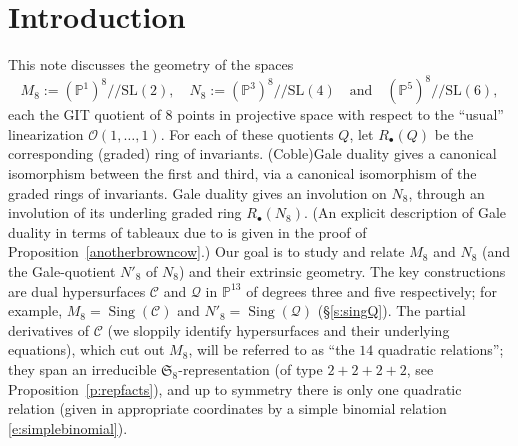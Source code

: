 \documentclass{amsart}
\theoremstyle{definition}
\theoremstyle{remark}
\DeclareMathOperator{\Sing}{Sing}
\def\SL{\mathrm{SL}}
\def\SS{\mathfrak{S}}
\def\proj{\mathbb{P}}
\def\cq{/\!/}
\def\cubic{\mathcal{C}}
\def\quintic{\mathcal{Q}}
\let\mc\mathcal
\begin{document}
\tableofcontents


\section{Introduction}

This note discusses the  geometry of the spaces
\begin{displaymath}
M_8 := (\proj^1)^8 \!\cq \SL(2), \quad  N_8 := (\proj^3)^8 \!\cq \SL(4) \quad \text{and}
\quad (\proj^5)^8 \!\cq \SL(6),
\end{displaymath}
each the GIT quotient of $8$ points in projective space with respect to the ``usual'' linearization
$\mc{O}(1,\dots,1)$.  For each of these quotients $Q$, let $R_{\bullet}(Q)$  be the corresponding (graded) ring of
invariants.  (Coble\nobreakdash\textendash)Gale duality gives a canonical isomorphism between the first and third, via
a canonical isomorphism of the graded rings of invariants.  Gale duality gives an involution on $N_8$, through an
involution of its underling graded ring $R_{\bullet}(N_8)$.   (An explicit description of Gale duality in terms of
tableaux due to \cite{hm} is given in the proof of Proposition~\ref{anotherbrowncow}.)  Our goal is to study and relate
$M_8$ and $N_8$ (and the Gale-quotient $N'_8$ of $N_8$) and their extrinsic geometry.  The key constructions are dual
hypersurfaces $\cubic$ and $\quintic$ in $\proj^{13}$ of degrees three and five respectively; for example, $M_8 =
\Sing(\cubic)$ and $N'_8 = \Sing(\quintic)$ (\S \ref{s:singQ}).  The partial derivatives of $\cubic$ (we sloppily 
identify hypersurfaces and their underlying equations), which cut out $M_8$, will be referred to as ``the $14$
quadratic relations''; they span an irreducible $\SS_8$-representation (of type $2+2+2+2$,
see Proposition~\ref{p:repfacts}),
and up to symmetry there is only one quadratic relation (given in appropriate coordinates by a simple binomial relation
\eqref{e:simplebinomial}).

\end{document}
